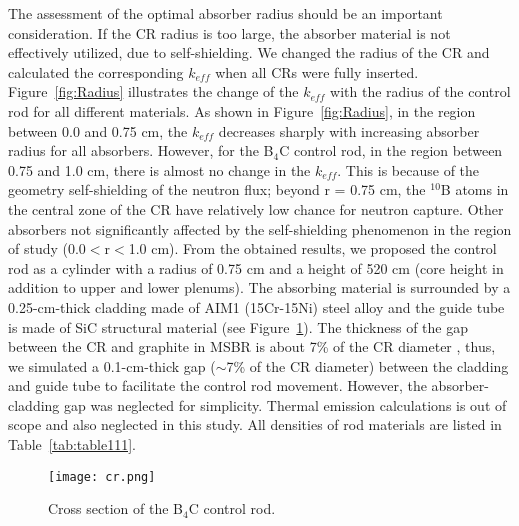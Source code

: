 The assessment of the optimal absorber radius should be an important consideration. If the CR radius is too large, the absorber material is not effectively utilized, due to self-shielding. We changed the radius of the CR and calculated the corresponding $k_{eff}$ when all CRs were fully inserted. Figure~\ref{fig:Radius} illustrates the change of the $k_{eff}$ with the radius of the control rod for all different materials. As shown in Figure~\ref{fig:Radius}, in the region between 0.0 and 0.75 cm, the $k_{eff}$ decreases sharply with increasing absorber radius for all absorbers. However, for the B$_4$C control rod, in the region between 0.75 and 1.0 cm, there is almost no change in the $k_{eff}$. This is because of the geometry self-shielding of the neutron flux; beyond r = 0.75 cm, the $^{10}$B atoms in the central zone of the CR have relatively low chance for neutron capture. Other absorbers not significantly affected by the self-shielding phenomenon in the region of study (0.0$<$r$<$1.0 cm). From the obtained results, we proposed the control rod as a cylinder with a radius of 0.75 cm and a height of 520 cm (core height in addition to upper and lower plenums).
The absorbing material is surrounded by a 0.25-cm-thick cladding made of AIM1 
(15Cr-15Ni) steel alloy \cite{SERAN2017285} and the guide tube is made of 
SiC structural material (see Figure~\ref{fig:cr}). The thickness of the gap between the CR and graphite in MSBR is about 7\% of the CR diameter \cite{robertson_conceptual_1971}, thus, we simulated a 0.1-cm-thick gap ($\sim$7\% of the CR diameter) between the cladding and guide tube to facilitate the control rod movement. However, the absorber-cladding gap was neglected for simplicity. Thermal emission calculations is out of scope and also neglected in this study. All densities of rod materials are listed in
Table~\ref{tab:table111}.

\begin{figure}[t!]  %
	\centering
	\hspace{+0.65in} 
	\texttt{[image: cr.png]}
	\caption{Cross section of the B$_4$C control rod.}
	\label{fig:cr}
\end{figure}

